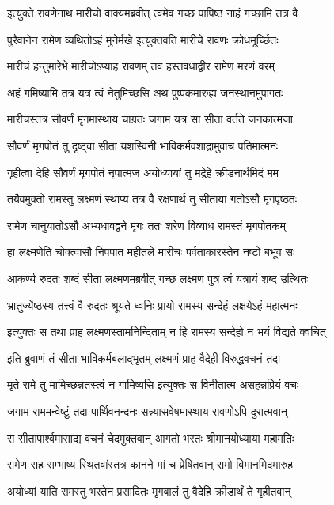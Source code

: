 \twolineshloka
{इत्युक्ते रावणेनाथ मारीचो वाक्यमब्रवीत्}
{त्वमेव गच्छ पापिष्ठ नाहं गच्छामि तत्र वै} %

\twolineshloka
{पुरैवानेन रामेण व्यथितोऽहं मुनेर्मखे}
{इत्युक्तवति मारीचे रावणः क्रोधमूर्च्छितः} %

\twolineshloka
{मारीचं हन्तुमारेभे मारीचोऽप्याह रावणम्}
{तव हस्तवधाद्वीर रामेण मरणं वरम्} %

\twolineshloka
{अहं गमिष्यामि तत्र यत्र त्वं नेतुमिच्छसि}
{अथ पुष्पकमारुह्य जनस्थानमुपागतः} %

\twolineshloka
{मारीचस्तत्र सौवर्णं मृगमास्थाय चाग्रतः}
{जगाम यत्र सा सीता वर्तते जनकात्मजा} %

\twolineshloka
{सौवर्णं मृगपोतं तु दृष्ट्वा सीता यशस्विनी}
{भाविकर्मवशाद्रामुवाच पतिमात्मनः} %

\twolineshloka
{गृहीत्वा देहि सौवर्णं मृगपोतं नृपात्मज}
{अयोध्यायां तु मद्रेहे क्रीडनार्थमिदं मम} %

\twolineshloka
{तयैवमुक्तो रामस्तु लक्ष्मणं स्थाप्य तत्र वै}
{रक्षणार्थ तु सीताया गतोऽसौ मृगपृष्ठतः} %

\twolineshloka
{रामेण चानुयातोऽसौ अभ्यधावद्वने मृगः}
{ततः शरेण विव्याध रामस्तं मृगपोतकम्} %

\twolineshloka
{हा लक्ष्मणेति चोक्त्वासौ निपपात महीतले}
{मारीचः पर्वताकारस्तेन नष्टो बभूव सः} %

\twolineshloka
{आकर्ण्य रुदतः शब्दं सीता लक्ष्मणमब्रवीत्}
{गच्छ लक्ष्मण पुत्र त्वं यत्रायं शब्द उत्थितः} %

\twolineshloka
{भ्रातुर्ज्येष्ठस्य तत्त्वं वै रुदतः श्रूयते ध्वनिः}
{प्रायो रामस्य सन्देहं लक्षयेऽहं महात्मनः} %

\twolineshloka
{इत्युक्तः स तथा प्राह लक्ष्मणस्तामनिन्दिताम्}
{न हि रामस्य सन्देहो न भयं विद्यते क्वचित्} %

\twolineshloka
{इति ब्रुवाणं तं सीता भाविकर्मबलाद्भृतम्}
{लक्ष्मणं प्राह वैदेही विरुद्धवचनं तदा} %

\twolineshloka
{मृते रामे तु मामिच्छन्नतस्त्वं न गामिष्यसि}
{इत्युक्तः स विनीतात्म असहन्नप्रियं वचः} %

\twolineshloka
{जगाम राममन्वेष्टुं तदा पार्थिवनन्दनः}
{सन्न्यासवेषमास्थाय रावणोऽपि दुरात्मवान्} %

\twolineshloka
{स सीतापार्श्वमासाद्य वचनं चेदमुक्तवान्}
{आगतो भरतः श्रीमानयोध्याया महामतिः} %

\twolineshloka
{रामेण सह सम्भाष्य स्थितवांस्तत्र कानने}
{मां च प्रेषितवान् रामो विमानमिदमारुह} %

\twolineshloka
{अयोध्यां याति रामस्तु भरतेन प्रसादितः}
{मृगबालं तु वैदेहि क्रीडार्थं ते गृहीतवान्} %

